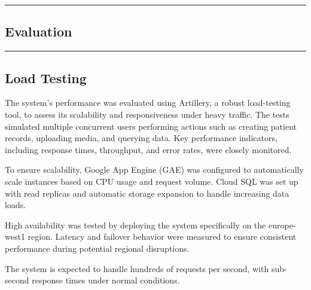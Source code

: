 {\color{gray}\hrule}
\begin{center}
\section{Evaluation}
\bigskip
\end{center}
{\color{gray}\hrule}
\begin{multicols}{2}
\subsection{Load Testing}
The system's performance was evaluated using Artillery, a robust load-testing tool, to assess its scalability and responsiveness under heavy traffic. The tests simulated multiple concurrent users performing actions such as creating patient records, uploading media, and querying data. Key performance indicators, including response times, throughput, and error rates, were closely monitored.

To ensure scalability, Google App Engine (GAE) was configured to automatically scale instances based on CPU usage and request volume. Cloud SQL was set up with read replicas and automatic storage expansion to handle increasing data loads.

High availability was tested by deploying the system specifically on the europe-west1 region. Latency and failover behavior were measured to ensure consistent performance during potential regional disruptions.

The system is expected to handle hundreds of requests per second, with sub-second response times under normal conditions.
\end{multicols}